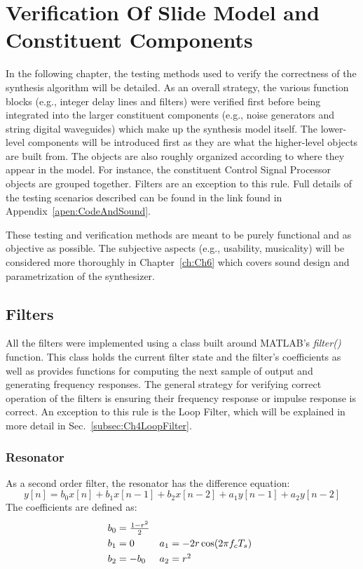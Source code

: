 \documentclass[../main.tex]{subfiles}
\begin{document}
\chapter{Verification Of Slide Model and Constituent Components}
\label{ch:four}

In the following chapter, the testing methods used to verify the correctness of the synthesis algorithm will be detailed. As an overall strategy, the various function blocks (e.g., integer delay lines and filters) were verified first before being integrated into the larger constituent components (e.g., noise generators and string digital waveguides) which make up the synthesis model itself. The lower-level components will be introduced first as they are what the higher-level objects are built from. The objects are also roughly organized according to where they appear in the model. For instance, the constituent Control Signal Processor objects are grouped together. Filters are an exception to this rule. Full details of the testing scenarios described can be found in the link found in Appendix~\ref{apen:CodeAndSound}.

These testing and verification methods are meant to be purely functional and as objective as possible. The subjective aspects (e.g., usability, musicality) will be considered more thoroughly in Chapter~\ref{ch:Ch6} which covers sound design and parametrization of the synthesizer.

\section{Filters}
All the filters were implemented using a class built around MATLAB's \emph{filter()} function. This class holds the current filter state and the filter's coefficients as well as provides functions for computing the next sample of output and generating frequency responses. The general strategy for verifying correct operation of the filters is ensuring their frequency response or impulse response is correct. An exception to this rule is the Loop Filter, which will be explained in more detail in Sec.~\ref{subsec:Ch4LoopFilter}.

\subsection{Resonator}
\label{subsec:resoTest}
As a second order filter, the resonator has the difference equation:
\begin{equation}
    y[n] = b_0 x[n] + b_1 x[n-1] + b_2 x[n-2] + a_1 y[n-1] + a_2 y[n-2]
\end{equation}
The coefficients are defined as:
\begin{equation}
\def\arraystretch{1.3}
\begin{array}{@{}lll@{}}
    b_0 = \frac{1-r^2}{2} & \\
    b_1 = 0 & a_1 = -2r\cos(2\pi f_c T_s)\\
    b_2 = -b_0 & a_2 = r^2\\
\end{array}
\end{equation}
\end{document}
